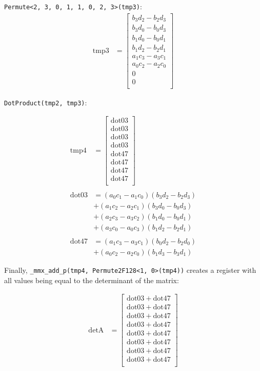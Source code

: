 \documentclass[fontsize = 10pt,DIV = 13]{scrartcl}
\newcommand{\pth}[1]{\left(#1\right)}
\begin{document}
\texttt{Permute<2, 3, 0, 1, 1, 0, 2, 3>(tmp3)}:
\begin{align*}
\mathrm{tmp3} 
&=
\begin{bmatrix}
b_3d_2 - b_2d_3\\
b_3d_0 - b_0d_3\\
b_1d_0 - b_0d_1\\
b_1d_2 - b_2d_1\\
a_1c_3 - a_3c_1\\
a_0c_2 - a_2c_0\\
0\\
0\\
\end{bmatrix}
\end{align*}

\texttt{DotProduct(tmp2, tmp3)}:

\begin{align*}
\mathrm{tmp4} 
&=
\begin{bmatrix}
	\mathrm{dot03}\\
	\mathrm{dot03}\\
	\mathrm{dot03}\\
	\mathrm{dot03}\\
	\mathrm{dot47}\\
	\mathrm{dot47}\\
	\mathrm{dot47}\\
	\mathrm{dot47}\\
\end{bmatrix}\\
\\
\mathrm{dot03}
&=\pth{a_0c_1 - a_1c_0}\pth{b_3d_2 - b_2d_3}\\
&+\pth{a_1c_2 - a_2c_1}\pth{b_3d_0 - b_0d_3}\\
&+\pth{a_2c_3 - a_3c_2}\pth{b_1d_0 - b_0d_1}\\
&+\pth{a_3c_0 - a_0c_3}\pth{b_1d_2 - b_2d_1}\\
\\
\mathrm{dot47}
&=\pth{a_1c_3 - a_3c_1}\pth{b_0d_2 - b_2d_0}\\
&+\pth{a_0c_2 - a_2c_0}\pth{b_1d_3 - b_3d_1}
\end{align*}

Finally, \texttt{_mmx_add_p(tmp4, Permute2F128<1, 0>(tmp4))} creates a register with all values being equal to the determinant of the matrix:

\begin{align*}
\mathrm{detA} 
&=
\begin{bmatrix}
\mathrm{dot03} + \mathrm{dot47}\\
\mathrm{dot03} + \mathrm{dot47}\\
\mathrm{dot03} + \mathrm{dot47}\\
\mathrm{dot03} + \mathrm{dot47}\\
\mathrm{dot03} + \mathrm{dot47}\\
\mathrm{dot03} + \mathrm{dot47}\\
\mathrm{dot03} + \mathrm{dot47}\\
\mathrm{dot03} + \mathrm{dot47}\\
\end{bmatrix}\\
\end{align*}
\end{document}
